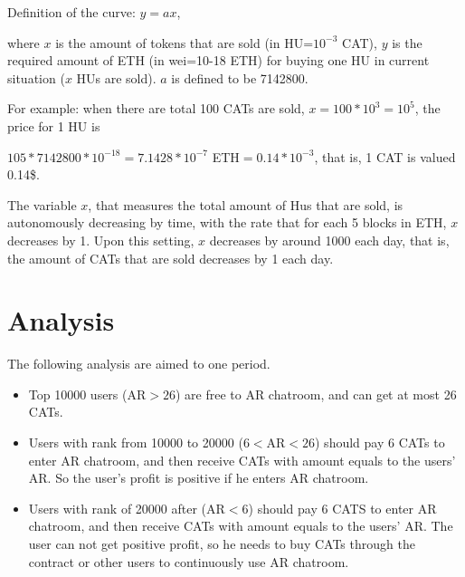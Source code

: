 \documentclass[12pt]{article}
\begin{document}
Definition of the curve: 
$y=ax
$,

where $x$ is the amount of tokens that are sold (in HU=$10^{-3}$ CAT), $y$ is the required amount of ETH (in wei=10-18 ETH) for buying one HU in current situation ($x$ HUs are sold). $a$ is defined to be 7142800.

For example: when there are total 100 CATs are sold, $x=100*10^3=10^5$, the price for 1 HU is

$105*7142800*10^{-18}=7.1428*10^{-7}$ ETH$=0.14*10^{-3}$, that is, 1 CAT is valued 0.14\$.

The variable $x$, that measures the total amount of Hus that are sold, is autonomously decreasing by time, with the rate that for each 5 blocks in ETH, $x$ decreases by 1. Upon this setting, $x$ decreases by around 1000 each day, that is, the amount of CATs that are sold decreases by 1 each day.

\section*{Analysis}
The following analysis are aimed to one period.
\begin{itemize}
\item Top 10000 users (AR$>26$) are free to AR chatroom, and can get at most 26 CATs. 
\item Users with rank from 10000 to 20000 ($6<$AR$<26$) should pay 6 CATs to enter AR chatroom, and then receive CATs with amount equals to the users’ AR. So the user’s profit is positive if he enters AR chatroom. 
\item Users with rank of 20000 after (AR$<6$) should pay 6 CATS to enter AR chatroom, and then receive CATs with amount equals to the users’ AR. The user can not get positive profit, so he needs to buy CATs through the contract or other users to continuously use AR chatroom.  
\end{itemize}
\end{document}
